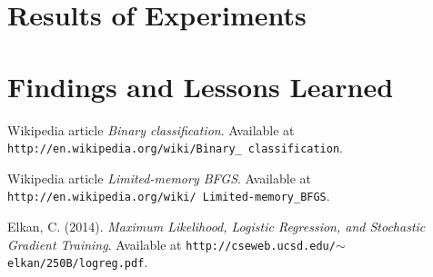 \documentclass{article} %
\begin{document}
\section{Results of Experiments}
\label{sec:results}






\section{Findings and Lessons Learned}
\label{sec:conclusion}





\begin{thebibliography}{1}

 Wikipedia article {\em Binary classification}. Available at {\tt http://en.wikipedia.org/wiki/Binary\_ classification}.

 Wikipedia article {\em Limited-memory BFGS}. Available at {\tt http://en.wikipedia.org/wiki/ Limited-memory\_BFGS}.

 Elkan, C. (2014). {\em Maximum Likelihood, Logistic Regression, and Stochastic Gradient Training}. Available at {\tt http://cseweb.ucsd.edu/$\sim$elkan/250B/logreg.pdf}.

\end{thebibliography}
\end{document}
